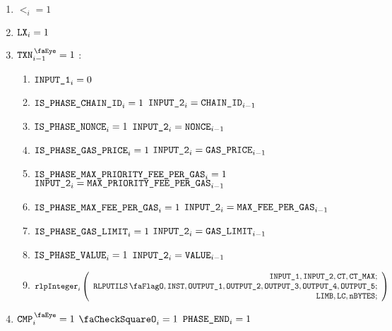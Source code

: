 \begin{center}
\end{center}

\begin{enumerate}
    \item $\lt_{i} =1$
    \item $\texttt{LX}_{i} =1$
    \item \If $\isTxn_{i-1} =1$ \Then:
        \begin{enumerate}
            \item                                             $\texttt{INPUT\_1}_{i} = 0$
            \item \If $\texttt{IS\_PHASE\_CHAIN\_ID}              _{i}=1$ \Then $\texttt{INPUT\_2} _{i} = \texttt{CHAIN\_ID}              _{i - 1}$
            \item \If $\texttt{IS\_PHASE\_NONCE}                _{i}=1$ \Then $\texttt{INPUT\_2} _{i} = \texttt{NONCE}                _{i - 1}$
            \item \If $\texttt{IS\_PHASE\_GAS\_PRICE}             _{i}=1$ \Then $\texttt{INPUT\_2} _{i} = \texttt{GAS\_PRICE}             _{i - 1}$
            \item \If $\texttt{IS\_PHASE\_MAX\_PRIORITY\_FEE\_PER\_GAS} _{i}=1$ \Then $\texttt{INPUT\_2} _{i} = \texttt{MAX\_PRIORITY\_FEE\_PER\_GAS} _{i - 1}$
            \item \If $\texttt{IS\_PHASE\_MAX\_FEE\_PER\_GAS}         _{i}=1$ \Then $\texttt{INPUT\_2} _{i} = \texttt{MAX\_FEE\_PER\_GAS}         _{i - 1}$
            \item \If $\texttt{IS\_PHASE\_GAS\_LIMIT}             _{i}=1$ \Then $\texttt{INPUT\_2} _{i} = \texttt{GAS\_LIMIT}             _{i - 1}$
            \item \If $\texttt{IS\_PHASE\_VALUE}                _{i}=1$ \Then $\texttt{INPUT\_2} _{i} = \texttt{VALUE}             _{i - 1}$
            \item
                \[
                    \rlpInteger _{i}
                    \left(
                    \begin{array}{r}
                        \inputColumn{1},
                        \inputColumn{2},
                        \ct,
                        \maxCt; \\
                        \rlpUtilsFlag,
                        \INST,
                        \resultColumn{1},
                        \resultColumn{2},
                        \resultColumn{3},
                        \resultColumn{4},
                        \resultColumn{5}; \\
                        \limb,
                        \lc,
                        \limbsize; \\
                    \end{array}
                    \right)
                \]
        \end{enumerate}
    \item \If $\isCmp_{i} =1$ \et $\done_{i}=1$ \Then $\texttt{PHASE\_END}_{i}=1$
\end{enumerate}
